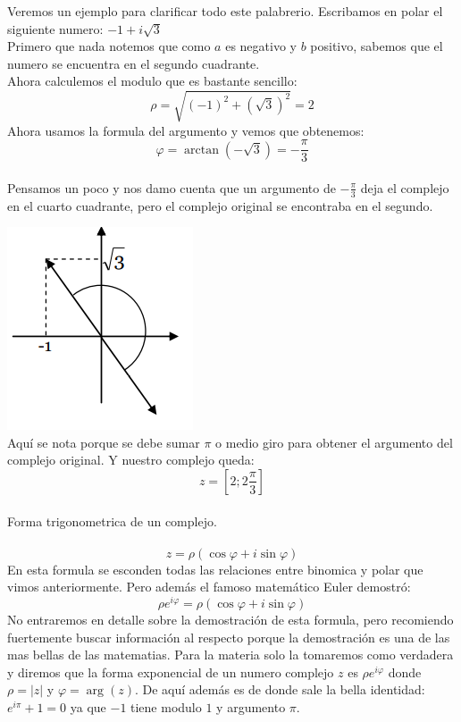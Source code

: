 \documentclass[]{article}
\begin{document}
Veremos un ejemplo para clarificar todo este palabrerio. Escribamos en polar el siguiente numero: $-1 + i \sqrt{3}$
\\
Primero que nada notemos que como $a$ es negativo y $b$ positivo, sabemos que el numero se encuentra en el segundo cuadrante.
\\
Ahora calculemos el modulo que es bastante sencillo:
$$
\rho =  \sqrt{(-1)^{2} + (\sqrt{3})^{2}} = 2
$$
Ahora usamos la formula del argumento y vemos que obtenemos:
$$
\varphi = \arctan(-\sqrt{3}) = -\frac{\pi}{3}
$$
\\
Pensamos un poco y nos damo cuenta que un argumento de $-\frac{\pi}{3}$ deja el complejo en el cuarto cuadrante, pero el complejo original se encontraba en el segundo.

\includegraphics{../../../Imagenes/Superior/Complejos/Complejos03.PNG}
\\
Aquí se nota porque se debe sumar $\pi$ o medio giro para obtener el argumento del complejo original. Y nuestro complejo queda:
$$
z = [2 ; 2\frac{\pi}{3}]
$$
\\
\huge Forma trigonometrica de un complejo.
\normalsize
\\
\\
$$
z = \rho (\cos\varphi + i \sin\varphi)
$$
En esta formula se esconden todas las relaciones entre binomica y polar que vimos anteriormente. Pero además el famoso matemático Euler demostró:
$$
\rho e^{i\varphi} = \rho (\cos\varphi + i \sin\varphi)
$$
No entraremos en detalle sobre la demostración de esta formula, pero recomiendo fuertemente buscar información al respecto porque la demostración es una de las mas bellas de las matematias. Para la materia solo la tomaremos como verdadera y diremos que la forma exponencial de un numero complejo $z$ es $\rho e^{i\varphi}$ donde $\rho = |z|$ y $\varphi = \arg(z)$. De aquí además es de donde sale la bella identidad: $e^{i\pi} + 1 = 0 $ ya que $-1$ tiene modulo $1$ y argumento $\pi$.
\\
\end{document}
